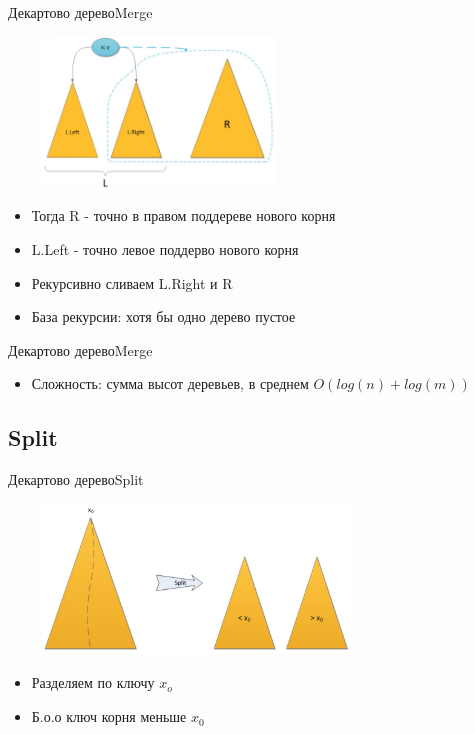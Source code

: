 \documentclass[10pt]{beamer}
\begin{document}
\begin{frame}[fragile]{Декартово дерево}{Merge}
\begin{center}
\includegraphics[width=8cm, height=4cm]{Term_1/Source/Pirctures/treap_merge_step.jpg}
\end{center}
\begin{itemize}
    \item Тогда R - точно в правом поддереве нового корня
    \item L.Left -  точно левое поддерво нового корня
    \item Рекурсивно сливаем L.Right и R
    \item База рекурсии: хотя бы одно дерево пустое
\end{itemize}
\end{frame}

\begin{frame}[fragile]{Декартово дерево}{Merge}
\begin{itemize}
    \item Сложность: сумма высот деревьев, в среднем $O(log(n) + log(m))$
\end{itemize}
\end{frame}

\subsection{Split}
\begin{frame}[fragile]{Декартово дерево}{Split}
\begin{center}
    \includegraphics[width=10cm, height=4cm]{Term_1/Source/Pirctures/treap_split.jpg}\\
\end{center}
\begin{itemize}
    \item Разделяем по ключу $x_o$
    \item Б.о.о ключ корня меньше $x_0$
\end{itemize}
\end{frame}
\end{document}
